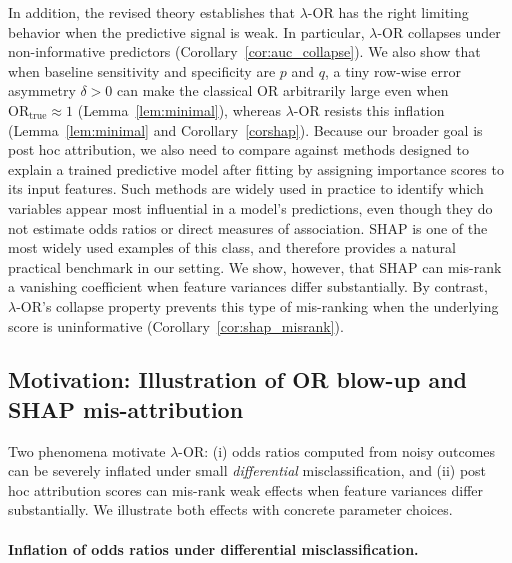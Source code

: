 \documentclass[pdflatex,sn-mathphys-num]{sn-jnl}%
\newcommand{\SPOR}{\textrm{$\lambda$-OR}}
\theoremstyle{thmstyleone}%
\theoremstyle{thmstyletwo}%
\theoremstyle{thmstylethree}%
\begin{document}
In addition, the revised theory establishes that $\SPOR$ has the right limiting behavior when the predictive signal is weak. In particular, $\SPOR$ collapses under non-informative predictors (Corollary~\ref{cor:auc_collapse}). We also show that when baseline sensitivity and specificity are \(p\) and \(q\), a tiny row-wise error asymmetry \(\delta>0\) can make the classical \(\mathrm{OR}\) arbitrarily large even when \(\mathrm{OR}_{\text{true}}\approx 1\) (Lemma~\ref{lem:minimal}), whereas $\SPOR$ resists this inflation (Lemma~\ref{lem:minimal} and Corollary~\ref{corshap}). Because our broader goal is post hoc attribution, we also need to compare against methods designed to explain a trained predictive model after fitting by assigning importance scores to its input features. Such methods are widely used in practice to identify which variables appear most influential in a model's predictions, even though they do not estimate odds ratios or direct measures of association. SHAP is one of the most widely used examples of this class, and therefore provides a natural practical benchmark in our setting. We show, however, that  SHAP can mis-rank a vanishing coefficient when feature variances differ substantially. By contrast, $\SPOR$'s collapse property prevents this type of mis-ranking when the underlying score is uninformative (Corollary~\ref{cor:shap_misrank}).
\subsection{Motivation: Illustration of OR blow-up and SHAP mis-attribution}\label{sec:motivation}

Two phenomena motivate $\SPOR$: (i) odds ratios computed from noisy outcomes can be severely inflated under small \emph{differential} misclassification, and (ii) post hoc attribution scores can mis-rank weak effects when feature variances differ substantially. We illustrate both effects with concrete parameter choices.

\paragraph{Inflation of odds ratios under differential misclassification.}
\end{document}
